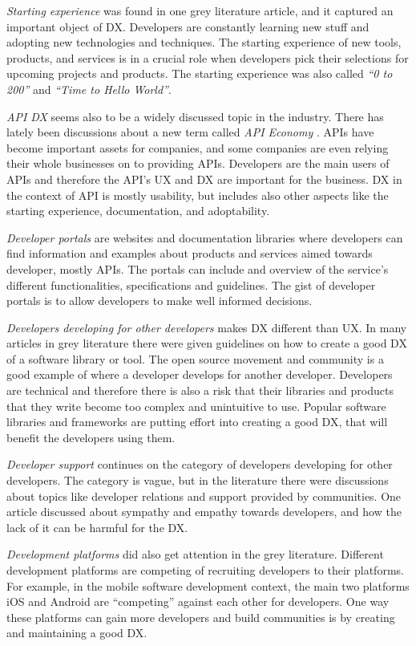 \documentclass[english, 12pt, a4paper, sci, utf8, a-1b, online]{aaltothesis}
\begin{document}
\textit{Starting experience} was found in one grey literature article, and it captured an important object of DX. Developers are constantly learning new stuff and adopting new technologies and techniques. The starting experience of new tools, products, and services is in a crucial role when developers pick their selections for upcoming projects and products. The starting experience was also called \textit{``0 to 200''} and \textit{``Time to Hello World''}.

\textit{API DX} seems also to be a widely discussed topic in the industry. There has lately been discussions about a new term called \textit{API Economy} \textcite{web-api-economy}. APIs have become important assets for companies, and some companies are even relying their whole businesses on to providing APIs. Developers are the main users of APIs and therefore the API's UX and DX are important for the business. DX in the context of API is mostly usability, but includes also other aspects like the starting experience, documentation, and adoptability.

\textit{Developer portals} are websites and documentation libraries where developers can find information and examples about products and services aimed towards developer, mostly APIs. The portals can include and overview of the service's different functionalities, specifications and guidelines. The gist of developer portals is to allow developers to make well informed decisions.

\textit{Developers developing for other developers} makes DX different than UX. In many articles in grey literature there were given guidelines on how to create a good DX of a software library or tool. The open source movement and community is a good example of where a developer develops for another developer. Developers are technical and therefore there is also a risk that their libraries and products that they write become too complex and unintuitive to use. Popular software libraries and frameworks are putting effort into creating a good DX, that will benefit the developers using them.

\textit{Developer support} continues on the category of developers developing for other developers. The category is vague, but in the literature there were discussions about topics like developer relations and support provided by communities. One article discussed about sympathy and empathy towards developers, and how the lack of it can be harmful for the DX.

\textit{Development platforms} did also get attention in the grey literature. Different development platforms are competing of recruiting developers to their platforms. For example, in the mobile software development context, the main two platforms iOS and Android are ``competing'' against each other for developers. One way these platforms can gain more developers and build communities is by creating and maintaining a good DX.
\end{document}
